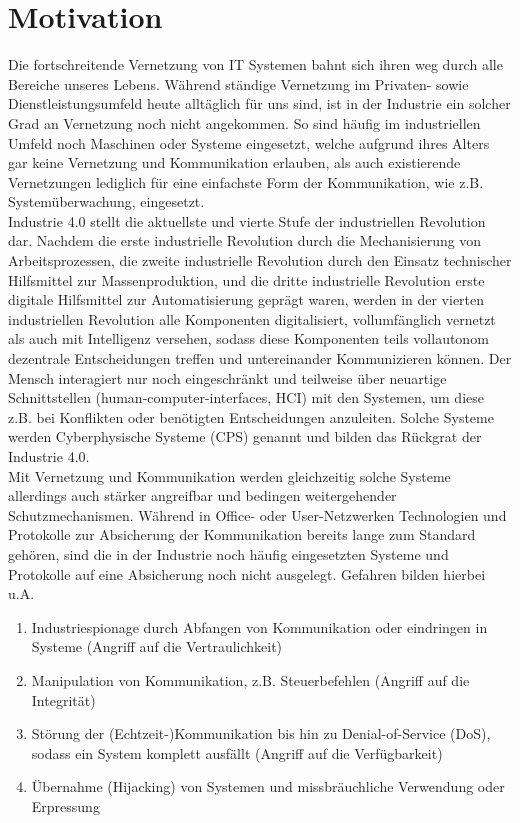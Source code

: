 \documentclass[conference]{IEEEtran}
\begin{document}
\section{Motivation}
Die fortschreitende Vernetzung von IT Systemen bahnt sich ihren weg durch alle Bereiche unseres Lebens. Während ständige Vernetzung im Privaten- sowie Dienstleistungsumfeld heute alltäglich für uns sind, ist in der Industrie ein solcher Grad an Vernetzung noch nicht angekommen. So sind häufig im industriellen Umfeld noch Maschinen oder Systeme eingesetzt, welche aufgrund ihres Alters gar keine Vernetzung und Kommunikation erlauben, als auch existierende Vernetzungen lediglich für eine einfachste Form der Kommunikation, wie z.B. Systemüberwachung, eingesetzt.\\

Industrie 4.0 stellt die aktuellste und vierte Stufe der industriellen Revolution dar. Nachdem die erste industrielle Revolution durch die Mechanisierung von Arbeitsprozessen, die zweite industrielle Revolution durch den Einsatz technischer Hilfsmittel zur Massenproduktion, und die dritte industrielle Revolution erste digitale Hilfsmittel zur Automatisierung geprägt waren, werden in der vierten industriellen Revolution alle Komponenten digitalisiert, vollumfänglich vernetzt als auch mit Intelligenz versehen, sodass diese Komponenten teils vollautonom dezentrale Entscheidungen treffen und untereinander Kommunizieren können. Der Mensch interagiert nur noch eingeschränkt und teilweise über neuartige Schnittstellen (human-computer-interfaces, HCI) mit den Systemen, um diese z.B. bei Konflikten oder benötigten Entscheidungen anzuleiten. Solche Systeme werden Cyberphysische Systeme (CPS) genannt und bilden das Rückgrat der Industrie 4.0.\\

Mit Vernetzung und Kommunikation werden gleichzeitig solche Systeme allerdings auch stärker angreifbar und bedingen weitergehender Schutzmechanismen. Während in Office- oder User-Netzwerken
Technologien und Protokolle zur Absicherung der Kommunikation bereits lange zum Standard gehören, sind die in der Industrie noch häufig eingesetzten Systeme und Protokolle auf eine Absicherung noch nicht ausgelegt. Gefahren bilden hierbei u.A.

\vspace{.5em}

\renewcommand{\labelenumi}{\alph{enumi})}
\begin{enumerate}
	\item Industriespionage durch Abfangen von Kommunikation oder eindringen in Systeme (Angriff auf die Vertraulichkeit)
	\item Manipulation von Kommunikation, z.B. Steuerbefehlen (Angriff auf die Integrität)
	\item Störung der (Echtzeit-)Kommunikation bis hin zu Denial-of-Service (DoS), sodass ein System komplett ausfällt (Angriff auf die Verfügbarkeit)
	\item Übernahme (Hijacking) von Systemen und missbräuchliche Verwendung oder Erpressung
\end{enumerate}
\end{document}
